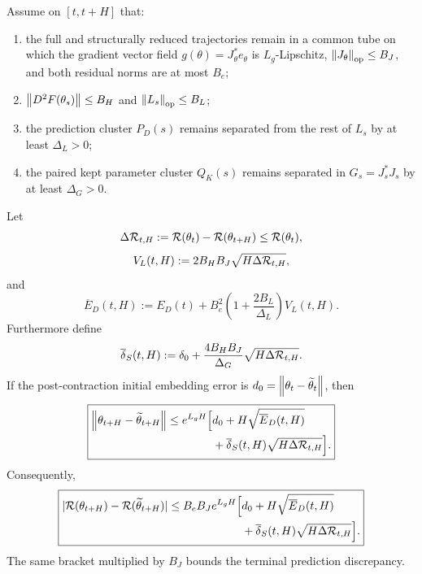 \begin{theorem}\label{thm:master-safe}
Assume on $[t,t+H]$ that:
\begin{enumerate}[label=(\roman*)]
\item the full and structurally reduced trajectories remain in a common tube on which the gradient vector field $g(\theta)=J_\theta^\ast e_\theta$ is $L_g$-Lipschitz, $\left\lVert J_\theta\right\rVert_{\mathrm{op}}\le B_J$, and both residual norms are at most $B_e$;
\item $\left\lVert D^2F(\theta_s)\right\rVert\le B_H$ and $\left\lVert L_s\right\rVert_{\mathrm{op}}\le B_L$;
\item the prediction cluster $P_D(s)$ remains separated from the rest of $L_s$ by at least $\Delta_L>0$;
\item the paired kept parameter cluster $Q_K(s)$ remains separated in $G_s=J_s^\ast J_s$ by at least $\Delta_G>0$.
\end{enumerate}
Let
\[
\Delta\mathcal R_{t,H}:=\mathcal R(\theta_t)-\mathcal R(\theta_{t+H})\le \mathcal R(\theta_t),
\]
\[
V_L(t,H):=2B_HB_J\sqrt{H\Delta\mathcal R_{t,H}},
\]
and
\[
\overline E_D(t,H)
:=E_D(t)
+B_e^2\left(1+\frac{2B_L}{\Delta_L}\right)V_L(t,H).
\]
Furthermore define
\[
\overline\delta_S(t,H)
:=\delta_0+
\frac{4B_HB_J}{\Delta_G}\sqrt{H\Delta\mathcal R_{t,H}}.
\]
If the post-contraction initial embedding error is $d_0=\left\lVert \theta_t-\widetilde\theta_t\right\rVert$, then
\[
\boxed{
\begin{aligned}
\left\lVert \theta_{t+H}-\widetilde\theta_{t+H}\right\rVert
\le e^{L_gH}\Big[&d_0
+H\sqrt{\overline E_D(t,H)}\\
&+\overline\delta_S(t,H)\sqrt{H\Delta\mathcal R_{t,H}}
\Big].
\end{aligned}}
\]
Consequently,
\[
\boxed{
\begin{aligned}
|\mathcal R(\theta_{t+H})-\mathcal R(\widetilde\theta_{t+H})|
\le B_eB_Je^{L_gH}\Big[&d_0
+H\sqrt{\overline E_D(t,H)}\\
&+\overline\delta_S(t,H)\sqrt{H\Delta\mathcal R_{t,H}}
\Big].
\end{aligned}}
\]
The same bracket multiplied by $B_J$ bounds the terminal prediction discrepancy.
\end{theorem}

